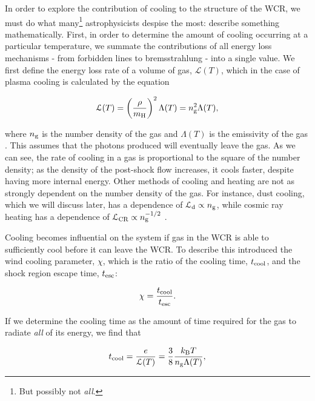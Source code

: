 In order to explore the contribution of cooling to the structure of the WCR, we must do what many\footnote{But possibly not \emph{all}.} astrophysicists despise the most: describe something mathematically.
First, in order to determine the amount of cooling occurring at a particular temperature, we summate the contributions of all energy loss mechanisms - from forbidden lines to bremsstrahlung - into a single value.
We first define the energy loss rate of a volume of gas, $\mathcal{L}(T)$, which in the case of plasma cooling is calculated by the equation

\begin{equation}
  \label{eq:energylossrate}
  \mathcal{L}(T) = \left(\frac{\rho}{m_\text{H}}\right)^2 \Lambda(T) = n_\text{g}^2 \Lambda(T) , 
\end{equation}

\noindent
where $n_\text{g}$ is the number density of the gas and $\Lambda(T)$ is the emissivity of the gas \parencite{stevens_colliding_1992}.
This assumes that the photons produced will eventually leave the gas.
As we can see, the rate of cooling in a gas is proportional to the square of the number density; as the density of the post-shock flow increases, it cools faster, despite having more internal energy.
Other methods of cooling and heating are not as strongly dependent on the number density of the gas.
For instance, dust cooling, which we will discuss later, has a dependence of $\mathcal{L}_\text{d} \propto n_\text{g}$, while cosmic ray heating has a dependence of $\mathcal{L}_\text{CR} \propto n_\text{g}^{-1/2}$ \parencite{wienerCosmicRayHeating2013}.

Cooling becomes influential on the system if gas in the WCR is able to sufficiently cool before it can leave the WCR.
To describe this \textcite{stevens_colliding_1992} introduced the wind cooling parameter, $\chi$, which is the ratio of the cooling time, $t_\text{cool}$, and the shock region escape time, $t_\text{esc}$:

\begin{equation}
  \chi = \frac{t_\text{cool}}{t_\text{esc}}.
\end{equation}

\noindent
If we determine the cooling time as the amount of time required for the gas to radiate \emph{all} of its energy, we find that

\begin{equation}
  \label{eq:taucool}
  t_\text{cool} = \frac{e}{\mathcal{L}(T)} = \frac{3}{8} \frac{k_\text{B} T}{n_\text{g} \Lambda(T)},
\end{equation}

